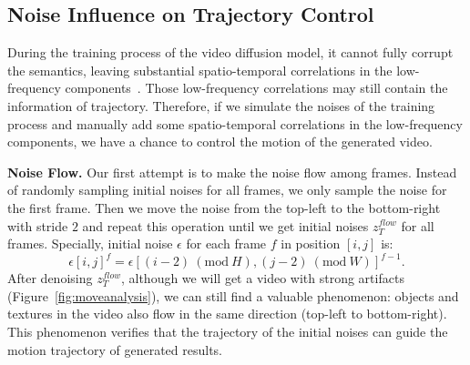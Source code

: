 \subsection{Noise Influence on Trajectory Control} 
\label{subsec:noise_analysis}

During the training process of the video diffusion model, it cannot fully corrupt the semantics, leaving substantial spatio-temporal correlations in the low-frequency components~\citep{wu2023freeinit}. Those low-frequency correlations may still contain the information of trajectory. Therefore, if we simulate the noises of the training process and manually add some spatio-temporal correlations in the low-frequency components, we have a chance to control the motion of the generated video.

\noindent\textbf{Noise Flow.} Our first attempt is to make the noise flow among frames. Instead of randomly sampling initial noises for all frames, we only sample the noise for the first frame. Then we move the noise from the top-left to the bottom-right with stride $2$ and repeat this operation until we get initial noises $z_{T}^{flow}$ for all frames. Specially, initial noise $\epsilon$ for each frame $f$ in position $[i, j]$ is:
%
\begin{equation}
\epsilon[i, j]^{f} = \epsilon[(i-2) \ (\mathrm{mod} \ H), (j-2) \ (\mathrm{mod} \ W)]^{f-1}.
\end{equation}
%
After denoising $z_{T}^{flow}$, although we will get a video with strong artifacts (Figure~\ref{fig:moveanalysis}), we can still find a valuable phenomenon: objects and textures in the video also flow in the same direction (top-left to bottom-right). This phenomenon verifies that the trajectory of the initial noises can guide the motion trajectory of generated results.

